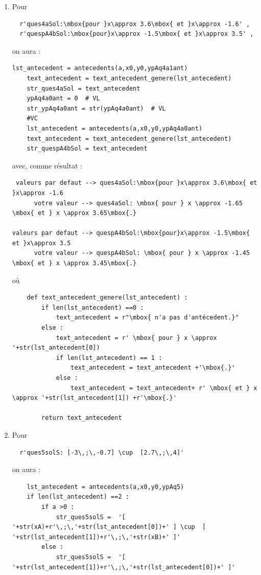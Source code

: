 {\begin{enumerate}
 \item Pour 
 \begin{verbatim}
  r'ques4aSol:\mbox{pour }x\approx 3.6\mbox{ et }x\approx -1.6' ,  
  r'quespA4bSol:\mbox{pour}x\approx -1.5\mbox{ et }x\approx 3.5' ,  
\end{verbatim}
on aura :
\begin{verbatim}
lst_antecedent = antecedents(a,x0,y0,ypAq4a1ant)
    text_antecedent = text_antecedent_genere(lst_antecedent)
    str_ques4aSol = text_antecedent
    ypAq4a0ant = 0  # VL
    str_ypAq4a0ant = str(ypAq4a0ant)  # VL
    #VC 
    lst_antecedent = antecedents(a,x0,y0,ypAq4a0ant)
    text_antecedent = text_antecedent_genere(lst_antecedent)    
    str_quespA4bSol = text_antecedent 
\end{verbatim}
avec, comme résultat : 
\begin{verbatim}
 valeurs par defaut --> ques4aSol:\mbox{pour }x\approx 3.6\mbox{ et }x\approx -1.6
      votre valeur --> ques4aSol: \mbox{ pour } x \approx -1.65 \mbox{ et } x \approx 3.65\mbox{.}

valeurs par defaut --> quespA4bSol:\mbox{pour}x\approx -1.5\mbox{ et }x\approx 3.5
      votre valeur --> quespA4bSol: \mbox{ pour } x \approx -1.45 \mbox{ et } x \approx 3.45\mbox{.}
\end{verbatim}
où
\begin{verbatim}
    def text_antecedent_genere(lst_antecedent) :
        if len(lst_antecedent) ==0 :  
            text_antecedent = r"\mbox{ n'a pas d'antécedent.}"
        else : 
            text_antecedent = r' \mbox{ pour } x \approx '+str(lst_antecedent[0])
            if len(lst_antecedent) == 1 :
                text_antecedent = text_antecedent +'\mbox{.}'
            else :
                text_antecedent = text_antecedent+ r' \mbox{ et } x \approx '+str(lst_antecedent[1]) +r'\mbox{.}'

        return text_antecedent 
\end{verbatim}

 \item Pour 
 \begin{verbatim}
  r'ques5solS: [-3\,;\,-0.7] \cup  [2.7\,;\,4]' 
\end{verbatim}
on aura :
\begin{verbatim}
    lst_antecedent = antecedents(a,x0,y0,ypAq5)
    if len(lst_antecedent) ==2 : 
        if a >0 :
            str_ques5solS =  '[ '+str(xA)+r'\,;\,'+str(lst_antecedent[0])+' ] \cup  [ '+str(lst_antecedent[1])+r'\,;\,'+str(xB)+' ]' 
        else :
            str_ques5solS =  '[ '+str(lst_antecedent[1])+r'\,;\,'+str(lst_antecedent[0])+' ]' 


\end{verbatim}
\end{enumerate}}
